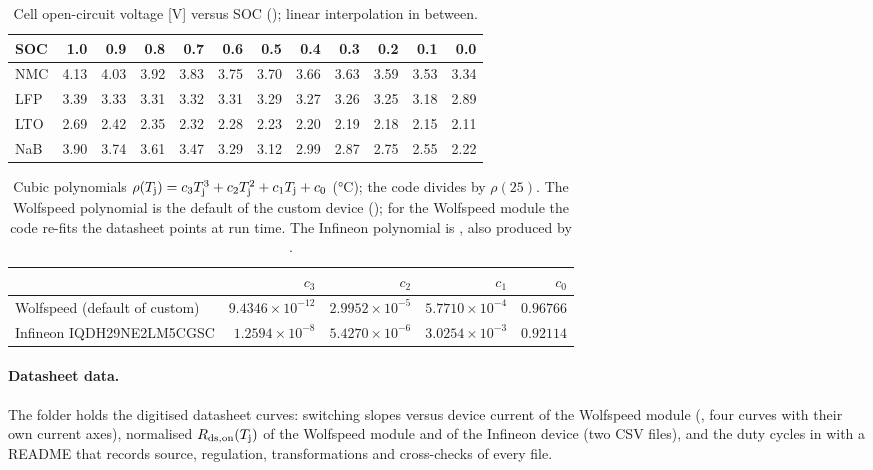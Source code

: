 \begin{table}[ht]
\centering
\caption{Cell open-circuit voltage [V] versus SOC (); linear interpolation in between.}
\label{tab:ocv}
\footnotesize
\setlength\tabcolsep{3pt}
\begin{tabular}{@{}lrrrrrrrrrrr@{}}
\toprule
SOC & 1.0 & 0.9 & 0.8 & 0.7 & 0.6 & 0.5 & 0.4 & 0.3 & 0.2 & 0.1 & 0.0 \\
\midrule
NMC & 4.13 & 4.03 & 3.92 & 3.83 & 3.75 & 3.70 & 3.66 & 3.63 & 3.59 & 3.53 & 3.34 \\
LFP & 3.39 & 3.33 & 3.31 & 3.32 & 3.31 & 3.29 & 3.27 & 3.26 & 3.25 & 3.18 & 2.89 \\
LTO & 2.69 & 2.42 & 2.35 & 2.32 & 2.28 & 2.23 & 2.20 & 2.19 & 2.18 & 2.15 & 2.11 \\
NaB & 3.90 & 3.74 & 3.61 & 3.47 & 3.29 & 3.12 & 2.99 & 2.87 & 2.75 & 2.55 & 2.22 \\
\bottomrule
\end{tabular}
\end{table}

\begin{table}[ht]
\centering
\caption{Cubic polynomials $\rho(T_\mathrm{j})=c_3T_\mathrm{j}^3+c_2T_\mathrm{j}^2+c_1T_\mathrm{j}+c_0$ (\si{\celsius}); the code divides by $\rho(25)$. The Wolfspeed polynomial is the default of the custom device (); for the Wolfspeed module the code re-fits the datasheet points at run time. The Infineon polynomial is , also produced by .}
\label{tab:rdsonpoly}
\footnotesize
\begin{tabular}{@{}lrrrr@{}}
\toprule
 & $c_3$ & $c_2$ & $c_1$ & $c_0$ \\
\midrule
Wolfspeed (default of custom) & $9.4346\times10^{-12}$ & $2.9952\times10^{-5}$ & $5.7710\times10^{-4}$ & $0.96766$ \\
Infineon IQDH29NE2LM5CGSC & $1.2594\times10^{-8}$ & $5.4270\times10^{-6}$ & $3.0254\times10^{-3}$ & $0.92114$ \\
\bottomrule
\end{tabular}
\end{table}

\paragraph{Datasheet data.} The folder  holds the digitised datasheet curves: switching slopes versus device current of the Wolfspeed module (, four curves with their own current axes), normalised $R_\mathrm{ds,on}(T_\mathrm{j})$ of the Wolfspeed module and of the Infineon device (two CSV files), and the duty cycles in  with a README that records source, regulation, transformations and cross-checks of every file.
